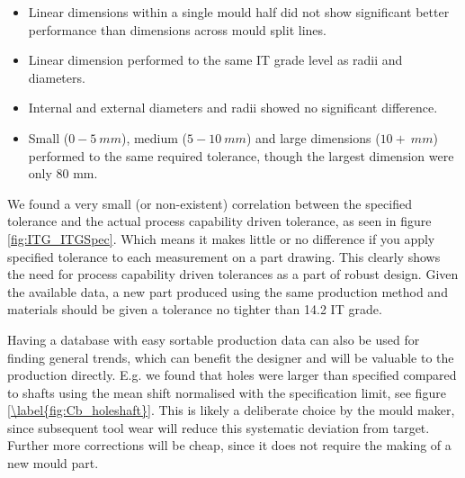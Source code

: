 \documentclass[aip,amsmath, reprint, author-year]{revtex4-1}
\begin{document}
\begin{itemize}
\item Linear dimensions within a single mould half did not show significant better performance than dimensions across mould split lines. 
\item Linear dimension performed to the same IT grade level as radii and diameters.
\item Internal and external diameters and radii showed no significant difference.
\item Small ($0-5 \ mm$), medium ($5-10 \ mm$) and large dimensions ($10+ \ mm$) performed to the same required tolerance, though the largest dimension were only 80 mm.
\end{itemize}

We found a very small (or non-existent) correlation between the specified tolerance and the actual process capability driven tolerance, as seen in figure \ref{fig:ITG_ITGSpec}. Which means it makes little or no difference if you apply specified tolerance to each measurement on a part drawing. This clearly shows the need for process capability driven tolerances as a part of robust design. Given the available data, a new part produced using the same production method and materials should be given a tolerance no tighter than 14.2 IT grade. 

Having a database with easy sortable production data can also be used for finding general trends, which can benefit the designer and will be valuable to the production directly. E.g. we found that holes were larger than specified compared to shafts using the mean shift normalised with the specification limit, see figure \ref{\label{fig:Cb_holeshaft}}. This is likely a deliberate choice by the mould maker, since subsequent tool wear will reduce this systematic deviation from target. Further more corrections will be cheap, since it does not require the making of a new mould part. 
\end{document}
